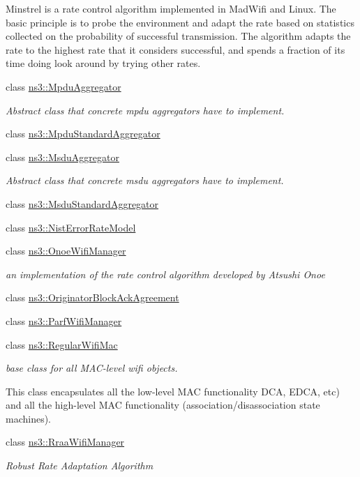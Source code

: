 \begin{DoxyCompactItemize}
\begin{DoxyCompactList}
Minstrel is a rate control algorithm implemented in Mad\+Wifi and Linux. The basic principle is to probe the environment and adapt the rate based on statistics collected on the probability of successful transmission. The algorithm adapts the rate to the highest rate that it considers successful, and spends a fraction of its time doing \textquotesingle{}look around\textquotesingle{} by trying other rates. \end{DoxyCompactList}\item 
class \hyperlink{classns3_1_1MpduAggregator}{ns3\+::\+Mpdu\+Aggregator}
\begin{DoxyCompactList}\small\item\em Abstract class that concrete mpdu aggregators have to implement. \end{DoxyCompactList}\item 
class \hyperlink{classns3_1_1MpduStandardAggregator}{ns3\+::\+Mpdu\+Standard\+Aggregator}
\item 
class \hyperlink{classns3_1_1MsduAggregator}{ns3\+::\+Msdu\+Aggregator}
\begin{DoxyCompactList}\small\item\em Abstract class that concrete msdu aggregators have to implement. \end{DoxyCompactList}\item 
class \hyperlink{classns3_1_1MsduStandardAggregator}{ns3\+::\+Msdu\+Standard\+Aggregator}
\item 
class \hyperlink{classns3_1_1NistErrorRateModel}{ns3\+::\+Nist\+Error\+Rate\+Model}
\item 
class \hyperlink{classns3_1_1OnoeWifiManager}{ns3\+::\+Onoe\+Wifi\+Manager}
\begin{DoxyCompactList}\small\item\em an implementation of the rate control algorithm developed by Atsushi Onoe \end{DoxyCompactList}\item 
class \hyperlink{classns3_1_1OriginatorBlockAckAgreement}{ns3\+::\+Originator\+Block\+Ack\+Agreement}
\item 
class \hyperlink{classns3_1_1ParfWifiManager}{ns3\+::\+Parf\+Wifi\+Manager}
\item 
class \hyperlink{classns3_1_1RegularWifiMac}{ns3\+::\+Regular\+Wifi\+Mac}
\begin{DoxyCompactList}\small\item\em base class for all M\+A\+C-\/level wifi objects.

This class encapsulates all the low-\/level M\+AC functionality D\+CA, E\+D\+CA, etc) and all the high-\/level M\+AC functionality (association/disassociation state machines). \end{DoxyCompactList}\item 
class \hyperlink{classns3_1_1RraaWifiManager}{ns3\+::\+Rraa\+Wifi\+Manager}
\begin{DoxyCompactList}\small\item\em Robust Rate Adaptation Algorithm


\end{DoxyCompactList}
\end{DoxyCompactItemize}

